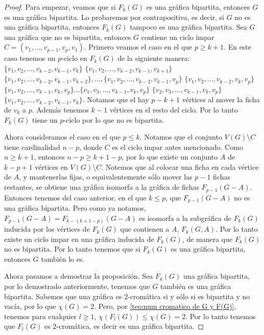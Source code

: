 \begin{proof}
    Para empezar, veamos que si $F_k(G)$ es una gr\'afica bipartita, entonces
    $G$ es una gr\'afica bipartita. Lo probaremos por contrapositiva, es decir,
    si $G$ no es una gr\'afica bipartita, entonces $F_k(G)$ tampoco es una
    gr\'afica bipartita. Sea $G$ una gr\'afica que no es bipartita, entonces $G$
    contiene un ciclo impar $C=(v_1, \dots, v_{p-1}, v_p, v_1)$. Primero veamos
    el caso en el que $p \geq k+1$. En este caso tenemos un $p$-ciclo en
    $F_k(G)$ de la siguiente manera: $\{v_1, v_2, \dots, v_{k-2}, v_{k-1},
    v_k\}$ $\{v_1, v_2, \dots, v_{k-2}, v_{k-1}, v_{k+1}\}$ $\{v_1, v_2, \dots,
    v_{k-2}, v_{k-1}, v_{k+2}\}, \dots, \{v_1, v_2, \dots, v_{k-2}, v_{k-1},
    v_p\}$ $\{v_1, v_2, \dots, v_{k-2}, v_k, v_p\}$ $\{v_1, v_2, \dots, v_{k-1},
    v_k, v_p\} \dots \{v_1, v_3, \dots, v_{k-1}, v_k, v_p\}$ $\{v_2, v_3,
    \dots, v_{k-1}, v_k, v_p\}$ $\{v_1, v_2, \dots, v_{k-2}, v_{k-1}, v_k\}$.
    Notamos que el hay $p-k+1$ v\'ertices al mover la ficha de $v_k$ a $p$.
    Adem\'as tenemos $k-1$ v\'ertices en el resto del ciclo. Por lo tanto
    $F_k(G)$ tiene un $p$-ciclo por lo que no es bipartita.
    
    Ahora consideramos el caso en el que $p \leq k$. Notamos que el conjunto
    $V(G)\setminus C$ tiene cardinalidad $n-p$, donde $C$ es el ciclo impar
    antes mencionado. Como $n \geq k+1$, entonces $n-p \geq k+1-p$, por lo que
    existe un conjunto $A$ de $k-p+1$ v\'ertices en $V(G)\setminus C$. Notemos
    que al colocar una ficha en cada v\'ertice de $A$, y mantenerlas fijas, o
    equivalentemente s\'olo mover las $p-1$ fichas restantes, se obtiene una
    gr\'afica isomorfa a la gr\'afica de fichas $F_{p-1}(G-A)$. Entonces tenemos
    del caso anterior, en el que $k \leq p$, que $F_{p-1}(G-A)$ no es una
    gr\'afica bipartita. Pero como ya notamos, $F_{p-1}(G-A) = F_{k-(k+1-p)}
    (G-A)$ es isomorfa a la subgr\'afica de $F_k(G)$ inducida por los v\'ertices
    de $F_k(G)$ que contienen a $A$, $F_k(G,A)$. Por lo tanto existe un ciclo
    impar en una gr\'afica inducida de $F_k(G)$, de manera que $F_k(G)$ no es
    bipartita. Por lo tanto tenemos que si $F_k(G)$ es una gr\'afica bipartita,
    entonces $G$ tambi\'en lo es.

    Ahora pasamos a demostrar la proposici\'on. Sea $F_k(G)$ una gr\'afica
    bipartita, por lo demostrado anteriormente, tenemos que $G$ tambi\'en es una
    gr\'afica bipartita. Sabemos que una gr\'afica es $2$-crom\'atica si y
    s\'olo si es bipartita y no vac\'ia, por lo que $\chi(G)=2$. Pero, por
    \cref{teo:num cromatico de G y F(G)}, tenemos para cualquier $l\geq 1$,
    $\chi (F_l(G)) \le \chi (G) = 2$. Por lo tanto tenemos que $F_l(G)$ es
    $2$-crom\'atica, es decir es una gr\'afica bipartita.
\end{proof}



